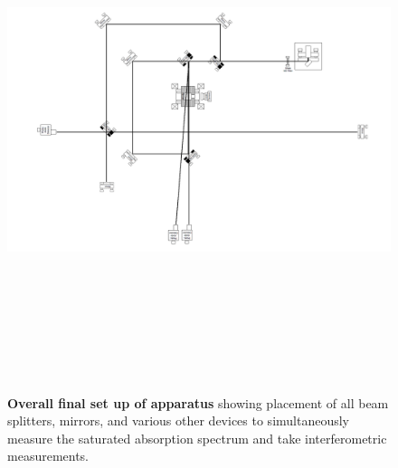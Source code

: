 \documentclass[paper=a4, fontsize=11pt]{scrartcl} %
\numberwithin{equation}{section}
\numberwithin{figure}{section}
\numberwithin{table}{section}
\begin{document}
\clearpage
\begin{figure}[h] \begin{center}
  \includegraphics[height=6in, angle = 90]{full.png}
  \caption{\textbf{Overall final set up of apparatus} showing
    placement of all beam splitters, mirrors, and various other
    devices to simultaneously measure the saturated absorption
    spectrum and take interferometric measurements. }
  \label{fig:setup}
\end{center} \end{figure}
\clearpage
\end{document}
